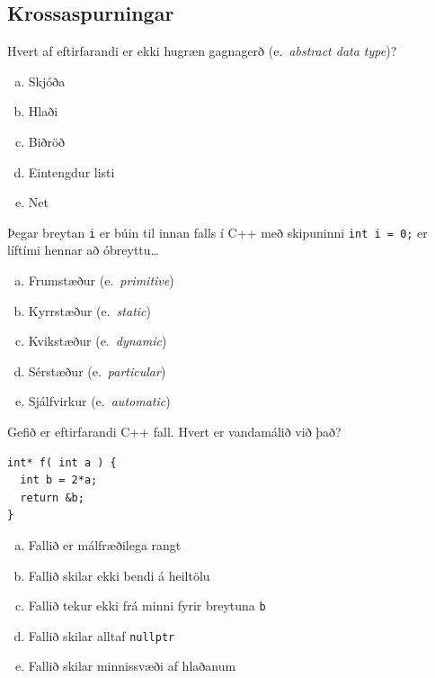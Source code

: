\documentclass[addpoints]{exam}
\newcommand{\eng}[1]{(e.\ \emph{#1})}
\begin{document}
\begin{questions}

	\section{Krossaspurningar}

	\question[3]

	Hvert af eftirfarandi er ekki hugræn gagnagerð \eng{abstract data type}?

	\begin{enumerate}[a)]
		\item Skjóða
		\item Hlaði
		\item Biðröð
		\item Eintengdur listi
		\item Net
	\end{enumerate}

	\question[3]

	Þegar breytan \texttt{i} er búin til innan falls í C++ með skipuninni \texttt{int i = 0;} er líftími hennar að óbreyttu\ldots

	\begin{enumerate}[a)]
		\item Frumstæður \eng{primitive}
		\item Kyrrstæður \eng{static}
		\item Kvikstæður \eng{dynamic}
		\item Sérstæður \eng{particular}
		\item Sjálfvirkur \eng{automatic}
	\end{enumerate}

	\question[3]

	Gefið er eftirfarandi C++ fall. Hvert er vandamálið við það?

	\begin{verbatim}
int* f( int a ) {
  int b = 2*a;
  return &b;
}
    \end{verbatim}

	\begin{enumerate}[a)]
		\item Fallið er málfræðilega rangt
		\item Fallið skilar ekki bendi á heiltölu
		\item Fallið tekur ekki frá minni fyrir breytuna \texttt{b}
		\item Fallið skilar alltaf \texttt{nullptr}
		\item Fallið skilar minnissvæði af hlaðanum
	\end{enumerate}


\end{questions}
\end{document}
